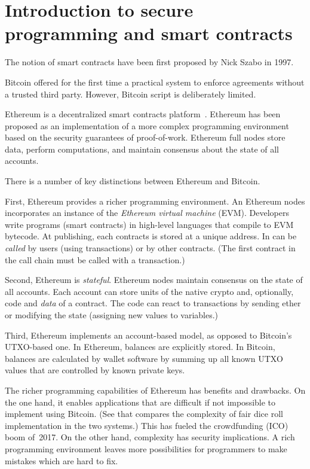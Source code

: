 \chapter{Introduction to secure programming and smart contracts}

\label{Chapter09Introcontracts}

The notion of smart contracts have been first proposed by Nick Szabo in 1997.

Bitcoin offered for the first time a practical system to enforce agreements without a trusted third party.
However, Bitcoin script is deliberately limited.

Ethereum is a decentralized smart contracts platform~\cite{Buterin2014, Wood2014}.
Ethereum has been proposed as an implementation of a more complex programming environment based on the security guarantees of proof-of-work.
Ethereum full nodes store data, perform computations, and maintain consensus about the state of all accounts.

There is a number of key distinctions between Ethereum and Bitcoin.

First, Ethereum provides a richer programming environment.
An Ethereum nodes incorporates an instance of the \textit{Ethereum virtual machine} (EVM).
Developers write programs (smart contracts) in high-level languages that compile to EVM bytecode.
At publishing, each contracts is stored at a unique address.
In can be \textit{called} by users (using transactions) or by other contracts.
(The first contract in the call chain must be called with a transaction.)

Second, Ethereum is \textit{stateful}.
Ethereum nodes maintain consensus on the state of all accounts.
Each account can store units of the native crypto and, optionally, code and \textit{data} of a contract.
The code can react to transactions by sending ether or modifying the state (assigning new values to variables.)

Third, Ethereum implements an account-based model, as opposed to Bitcoin's UTXO-based one.
In Ethereum, balances are explicitly stored.
In Bitcoin, balances are calculated by wallet software by summing up all known UTXO values that are controlled by known private keys.

The richer programming capabilities  of Ethereum has benefits and drawbacks.
On the one hand, it enables applications that are difficult if not impossible to implement using Bitcoin.
(See  that compares the complexity of fair dice roll implementation in the two systems.)
This has fueled the crowdfunding (ICO) boom of~2017.
On the other hand, complexity has security implications.
A rich programming environment leaves more possibilities for programmers to make mistakes which are hard to fix.

